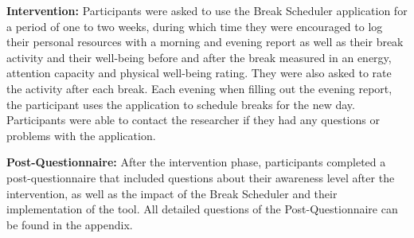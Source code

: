 \documentclass{hasel_thesis}
\begin{document}
\textbf{Intervention:} Participants were asked to use the Break Scheduler application for a period of one to two weeks, during which time they were encouraged to log their personal resources with a morning and evening report as well as their break activity and their well-being before and after the break measured in an energy, attention capacity and physical well-being rating. They were also asked to rate the activity after each break. Each evening when filling out the evening report, the participant uses the application to schedule breaks for the new day. Participants were able to contact the researcher if they had any questions or problems with the application.

\textbf{Post-Questionnaire:} After the intervention phase, participants completed a post-questionnaire that included questions about their awareness level after the intervention, as well as the impact of the Break Scheduler and their implementation of the tool. All detailed questions of the Post-Questionnaire can be found in the appendix.
\end{document}
